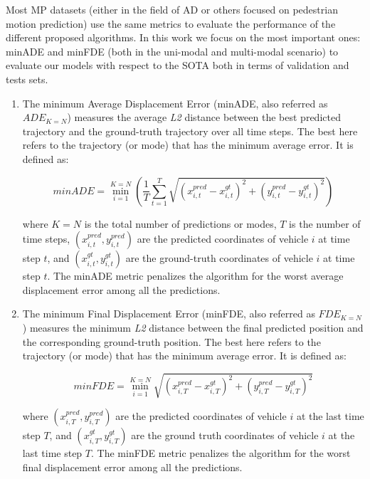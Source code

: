Most \ac{MP} datasets (either in the field of \ac{AD} or others focused on pedestrian motion prediction) use the same metrics to evaluate the performance of the different proposed algorithms. In this work we focus on the most important ones: \ac{minADE} and \ac{minFDE} (both in the uni-modal and multi-modal scenario) to evaluate our models with respect to the \ac{SOTA} both in terms of validation and tests sets.

\begin{enumerate}
	
	\item The minimum Average Displacement Error (minADE, also referred as $ADE_{K=N}$) measures the average \textit{L2} distance between the best predicted trajectory and the ground-truth trajectory over all time steps. The best here refers to the trajectory (or mode) that has the minimum average error. It is defined as:
	
	\[
	minADE = \min_{i=1}^{K=N} \left( \frac{1}{T}\sum_{t=1}^{T}\sqrt{{(x_{i,t}^{pred} - x_{i,t}^{gt})}^2 + {(y_{i,t}^{pred} - y_{i,t}^{gt})}^2} \right)
	\]
	
	where $K=N$ is the total number of predictions or modes, $T$ is the number of time steps, $(x_{i,t}^{pred}, y_{i,t}^{pred})$ are the predicted coordinates of vehicle $i$ at time step $t$, and $(x_{i,t}^{gt}, y_{i,t}^{gt})$ are the ground-truth coordinates of vehicle $i$ at time step $t$. The \ac{minADE} metric penalizes the algorithm for the worst average displacement error among all the predictions.
	
	\item The minimum Final Displacement Error (minFDE, also referred as $FDE_{K=N}$) measures the minimum \textit{L2} distance between the final predicted position and the corresponding ground-truth position. The best here refers to the trajectory (or mode) that has the minimum average error. It is defined as:
	
	\[
	minFDE = \min_{i=1}^{K=N} \sqrt{{(x_{i,T}^{pred} - x_{i,T}^{gt})}^2 + {(y_{i,T}^{pred} - y_{i,T}^{gt})}^2}
	\]
	
	where $(x_{i,T}^{pred}, y_{i,T}^{pred})$ are the predicted coordinates of vehicle $i$ at the last time step $T$, and $(x_{i,T}^{gt}, y_{i,T}^{gt})$ are the ground truth coordinates of vehicle $i$ at the last time step $T$. The \ac{minFDE} metric penalizes the algorithm for the worst final displacement error among all the predictions.
	
\end{enumerate}

